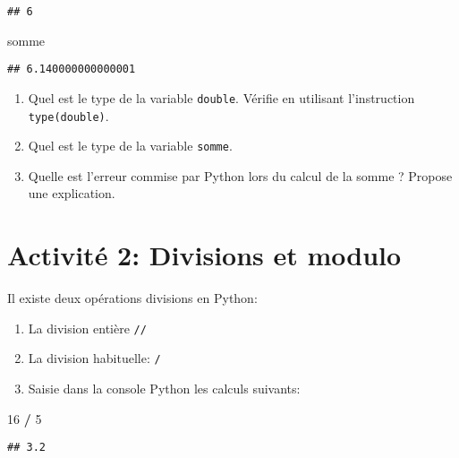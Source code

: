 \documentclass[
]{book}
\newenvironment{Shaded}{\begin{snugshade}}{\end{snugshade}}
\newcommand{\DecValTok}[1]{\textcolor[rgb]{0.00,0.00,0.81}{#1}}
\newcommand{\NormalTok}[1]{#1}
\newcommand{\OperatorTok}[1]{\textcolor[rgb]{0.81,0.36,0.00}{\textbf{#1}}}
\providecommand{\tightlist}{%
  \setlength{\itemsep}{0pt}\setlength{\parskip}{0pt}}
\def\tightlist{}
\begin{document}
\begin{verbatim}
## 6
\end{verbatim}

\begin{Shaded}
\begin{Highlighting}[]
\NormalTok{somme}
\end{Highlighting}
\end{Shaded}

\begin{verbatim}
## 6.140000000000001
\end{verbatim}

\begin{enumerate}
\def\labelenumi{\arabic{enumi}.}
\tightlist
\item
  Quel est le type de la variable \texttt{double}. Vérifie en utilisant l'instruction \texttt{type(double)}.
\item
  Quel est le type de la variable \texttt{somme}.
\item
  Quelle est l'erreur commise par Python lors du calcul de la somme ? Propose une explication.
\end{enumerate}

\newpage

\hypertarget{activituxe9-2-divisions-et-modulo}{%
\section{Activité 2: Divisions et modulo}\label{activituxe9-2-divisions-et-modulo}}

Il existe deux opérations divisions en Python:

\begin{enumerate}
\def\labelenumi{\arabic{enumi}.}
\item
  La division entière \texttt{//}
\item
  La division habituelle: \texttt{/}
\item
  Saisie dans la console Python les calculs suivants:
\end{enumerate}

\begin{Shaded}
\begin{Highlighting}[]
\DecValTok{16} \OperatorTok{/} \DecValTok{5}
\end{Highlighting}
\end{Shaded}

\begin{verbatim}
## 3.2
\end{verbatim}
\end{document}
